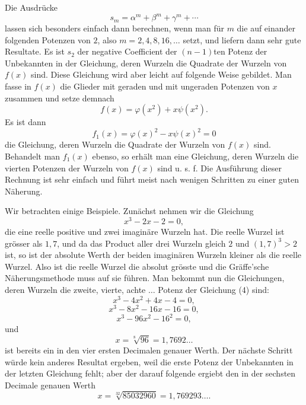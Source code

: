 \documentclass[11pt]{article}
\begin{document}
Die Ausdrücke
\[
        s_m=\alpha^m+\beta^m+\gamma^m+\cdots
\]
lassen sich besonders einfach dann berechnen, wenn man für $m$ die auf einander folgenden Potenzen von $2$, also $m=2,4,8,16,\ldots$ setzt, und liefern dann sehr gute Resultate. Es ist $s_2$ der negative Coefficient der $(n-1)$ten Potenz der Unbekannten in der Gleichung, deren Wurzeln die Quadrate der Wurzeln von $f(x)$ sind. Diese Gleichung wird aber leicht auf folgende Weise gebildet. Man fasse in $f(x)$ die Glieder mit geraden und mit ungeraden Potenzen von $x$ zusammen und setze demnach
\[
        f(x)=\varphi(x^2)+x\psi(x^2).
\]
Es ist dann
\[
        f_1(x)=\varphi(x)^2-x\psi(x)^2=0
\]
die Gleichung, deren Wurzeln die Quadrate der Wurzeln von $f(x)$ sind. Behandelt man $f_1(x)$ ebenso, so erhält man eine Gleichung, deren Wurzeln die vierten Potenzen der Wurzeln von $f(x)$ sind u. s. f. Die Ausführung dieser Rechnung ist sehr einfach und führt meist nach wenigen Schritten zu einer guten Näherung.

Wir betrachten einige Beispiele. Zunächst nehmen wir die Gleichung
\begin{equation}
        x^3-2x-2=0,
\tag{4}
\end{equation}
die eine reelle positive und zwei imaginäre Wurzeln hat. Die reelle Wurzel ist grösser als $1{,}7$, und da das Product aller drei Wurzeln gleich $2$ und $(1{,}7)^3>2$ ist, so ist der absolute Werth der beiden imaginären Wurzeln kleiner als die reelle Wurzel. Also ist die reelle Wurzel die absolut grösste und die Gräffe'sche Näherungsmethode muss auf sie führen. Man bekommt nun die Gleichungen, deren Wurzeln die zweite, vierte, achte $\ldots$ Potenz der Gleichung (4) sind:
\[
        x^3-4x^2+4x-4=0,
\]
\[
        x^3-8x^2-16x-16=0,
\]
\[
        x^3-96x^2-16^2=0,
\]
und
\[
        x=\sqrt[8]{96}=1{,}7692\ldots
\]
ist bereits ein in den vier ersten Decimalen genauer Werth. Der nächste Schritt würde kein anderes Resultat ergeben, weil die erste Potenz der Unbekannten in der letzten Gleichung fehlt; aber der darauf folgende ergiebt den in der sechsten Decimale genauen Werth
\[
        x=\sqrt[32]{85032960}=1{,}769293\ldots .
\]
\end{document}
